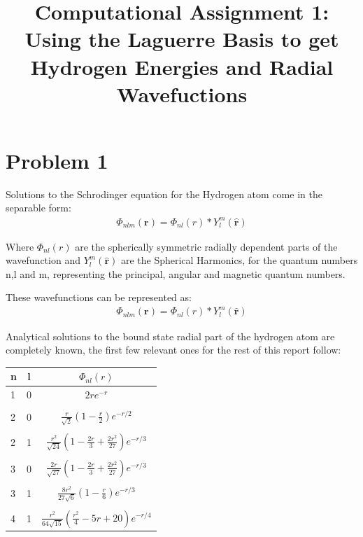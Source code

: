\documentclass{article}
\renewcommand{\vec}[1]{\mathbf{#1}}
\let\oldhat\hat
\renewcommand{\hat}[1]{\oldhat{\mathbf{#1}}}
\begin{document}
\noindent

	\title{Computational Assignment 1: Using the Laguerre Basis to get Hydrogen Energies and Radial Wavefuctions}
    \maketitle 
    
    \section{Problem 1}
    \label{problem 1}
    
    Solutions to the Schrodinger equation for the Hydrogen atom come in the separable form:
    \begin{gather}
    	\Phi_{nlm}(\vec{r}) =  \Phi_{nl}(r)*Y_{l}^m(\hat{\vec{r}})
    \end{gather}
    
    Where $\Phi_{nl}(r)$ are the spherically symmetric radially dependent parts of the wavefunction and $Y_{l}^m(\hat{\vec{r}})$ are the Spherical Harmonics, for the quantum numbers n,l and m, representing the principal, angular and magnetic quantum numbers. 
    
    These wavefunctions can be represented as:
    \begin{gather}
    	\Phi_{nlm}(\vec{r}) =  \Phi_{nl}(r)*Y_{l}^m(\hat{\vec{r}})
    \end{gather}
    
    Analytical solutions to the bound state radial part of the hydrogen atom are completely known, the first few relevant ones for the rest of this report follow:
    \large
    \begin{center}
    	\begin{tabular}{lcc}\toprule
    		n & l & $\Phi_{nl}(r)$ \\ \bottomrule
    		1 & 0  &   $2re^{-r}$          \\
    		&&\\
    		2 & 0  & $\frac{r}{\sqrt{2}}(1-\frac{r}{2})e^{-r/2} $  \\
    		&&\\
    		2 & 1  & $ \frac{r^2}{\sqrt{24}}(1-\frac{2r}{3} + \frac{2r^2}{27})e^{-r/3}  $  \\
    		&&\\
    		3 & 0  & $\frac{2r}{\sqrt{27}}(1-\frac{2r}{3}+\frac{2r^2}{27})e^{-r/3}$   \\
    		&&\\
    		3 & 1  & $\frac{8r^2}{27\sqrt{6}}(1-\frac{r}{6})e^{-r/3}$ \\ 
    		&&\\
    		4 & 1  & $\frac{r^2}{64\sqrt{15}}(\frac{r^2}{4}-5r+20)e^{-r/4}$ \\ \bottomrule
    	\end{tabular}
    \end{center}
    \normalsize
    
\end{document}
